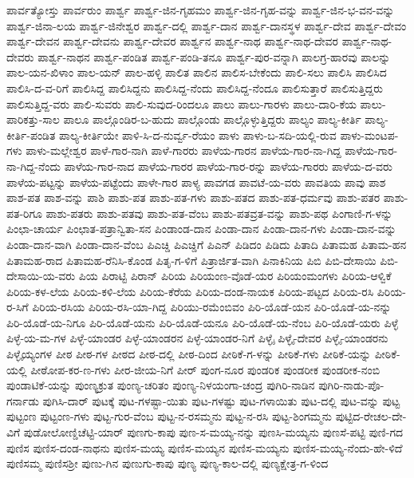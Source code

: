 ಪಾರ್ವತ್ಯೋಸ್ತು
ಪಾರ್ವರುಂ
ಪಾರ್ಶ್ವ
ಪಾರ್ಶ್ವ-ಜಿನ-ಗೃಹಮಂ
ಪಾರ್ಶ್ವ-ಜಿನ-ಗೃಹ-ವನ್ನು
ಪಾರ್ಶ್ವ-ಜಿನ-ಭ-ವನ-ವನ್ನು
ಪಾರ್ಶ್ವ-ಜಿನಾ-ಲಯ
ಪಾರ್ಶ್ವ-ಜಿನೇಶ್ವರ
ಪಾರ್ಶ್ವ-ದಲ್ಲಿ
ಪಾರ್ಶ್ವ-ದಾನ
ಪಾರ್ಶ್ವ-ದಾನಸ್ಥಳ
ಪಾರ್ಶ್ವ-ದೇವ
ಪಾರ್ಶ್ವ-ದೇವಂ
ಪಾರ್ಶ್ವ-ದೇವನ
ಪಾರ್ಶ್ವ-ದೇವನು
ಪಾರ್ಶ್ವ-ದೇವರ
ಪಾರ್ಶ್ವನ
ಪಾರ್ಶ್ವ-ನಾಥ
ಪಾರ್ಶ್ವ-ನಾಥ-ದೇವರ
ಪಾರ್ಶ್ವ-ನಾಥ-ದೇವರು
ಪಾರ್ಶ್ವ-ನಾಥನ
ಪಾರ್ಶ್ವ-ಪಂಡಿತ
ಪಾರ್ಶ್ವ-ಪಂಡಿ-ತನೂ
ಪಾರ್ಶ್ವ-ಪುರ-ವನ್ನಾಗಿ
ಪಾಲಗ್ರ-ಹಾರವು
ಪಾಲನ್ನು
ಪಾಲ-ಯನ-ಖಿಳಾಂ
ಪಾಲ-ಯನ್
ಪಾಲ-ಹಳ್ಳಿ
ಪಾಲಿತ
ಪಾಲಿನ
ಪಾಲಿಸ-ಬೇಕೆಂದು
ಪಾಲಿ-ಸಲು
ಪಾಲಿಸಿ
ಪಾಲಿಸಿದ
ಪಾಲಿಸಿ-ದ-ವ-ರಿಗೆ
ಪಾಲಿಸಿದ್ದ
ಪಾಲಿಸಿದ್ದನು
ಪಾಲಿಸಿದ್ದ-ನೆಂದು
ಪಾಲಿಸಿದ್ದ-ನೆಂದೂ
ಪಾಲಿಸುತ್ತಾರೆ
ಪಾಲಿಸುತ್ತಿದ್ದರು
ಪಾಲಿಸುತ್ತಿದ್ದ-ವರು
ಪಾಲಿ-ಸುವರು
ಪಾಲಿ-ಸುವುದ-ರಿಂದಲೂ
ಪಾಲು
ಪಾಲು-ಗಾರಳು
ಪಾಲು-ದಾರಿ-ಕೆಯ
ಪಾಲು-ಪಾರಿಕತ್ತು-ಸಾಲ
ಪಾಲೂ
ಪಾಲ್ಗೊಂಡಿರ-ಬ-ಹುದು
ಪಾಲ್ಗೊಂಡು
ಪಾಲ್ಗೊಳ್ಳುತ್ತಿದ್ದರು
ಪಾಲ್ಯಂ
ಪಾಲ್ಯ-ಕೀರ್ತಿ
ಪಾಲ್ಯ-ಕೀರ್ತಿ-ಪಂಡಿತ
ಪಾಲ್ಯ-ಕೀರ್ತಿಯೇ
ಪಾಳಿ-ಸಿ-ದ-ನುರ್ವ್ವ-ರೆಯಂ
ಪಾಳು
ಪಾಳು-ಬ-ಸದಿ-ಯಲ್ಲಿ-ರುವ
ಪಾಳು-ಮಂಟಪ-ಗಳು
ಪಾಳು-ಮಲ್ಲೇಶ್ವರ
ಪಾಳೆ-ಗಾರ-ನಾಗಿ
ಪಾಳೆ-ಗಾರರು
ಪಾಳೆಯ-ಗಾರನ
ಪಾಳೆಯ-ಗಾರ-ನಾ-ಗಿದ್ದ
ಪಾಳೆಯ-ಗಾರ-ನಾ-ಗಿದ್ದ-ನೆಂದು
ಪಾಳೆಯ-ಗಾರ-ನಾದ
ಪಾಳೆಯ-ಗಾರರ
ಪಾಳೆಯ-ಗಾರ-ರನ್ನು
ಪಾಳೆಯ-ಗಾರರು
ಪಾಳೆಯ-ದ-ವರು
ಪಾಳೆಯ-ಪಟ್ಟನ್ನು
ಪಾಳೆಯ-ಪಟ್ಟೆಂದು
ಪಾಳೇ-ಗಾರ
ಪಾಳ್ಯ
ಪಾವಗಡ
ಪಾವಟೆ-ಯ-ವರು
ಪಾವತಿಯ
ಪಾವು
ಪಾಶ
ಪಾಶ-ಪತ
ಪಾಶ-ವನ್ನು
ಪಾಶಿ
ಪಾಶು-ಪತ
ಪಾಶು-ಪತ-ಗಳು
ಪಾಶು-ಪತದ
ಪಾಶು-ಪತ-ಧರ್ಮವು
ಪಾಶು-ಪತರ
ಪಾಶು-ಪತ-ರಿಗೂ
ಪಾಶು-ಪತರು
ಪಾಶು-ಪತವು
ಪಾಶು-ಪತ-ವೆಂಬ
ಪಾಶು-ಪತವ್ರತ-ವನ್ನು
ಪಾಶು-ಪಥ
ಪಿಂಗಾಣಿ-ಗ-ಳನ್ನು
ಪಿಂಛಾ-ಚಾರ್ಯ
ಪಿಂಛಾತ-ಪತ್ರಾನ್ವಿತಾ-ಸನ
ಪಿಂಡಾಂಡ-ದಾನ
ಪಿಂಡಾ-ದಾನ
ಪಿಂಡಾ-ದಾನ-ಗಳು
ಪಿಂಡಾ-ದಾನ-ವನ್ನು
ಪಿಂಡಾ-ದಾನ-ವಾಗಿ
ಪಿಂಡಾ-ದಾನ-ವೆಂಬ
ಪಿಎಚ್ಡಿ
ಪಿಎಚ್ಡಿಗೆ
ಪಿಎನ್
ಪಿಡಿದಂ
ಪಿಡಿದು
ಪಿತಾದಿ
ಪಿತಾಮಹ
ಪಿತಾಮ-ಹನ
ಪಿತಾಮಹ-ರಾದ
ಪಿತಾಮಹ-ರೆನಿಸಿ-ಕೊಂಡ
ಪಿತೃ-ಗ-ಳಿಗೆ
ಪಿತ್ರಾರ್ಜಿತ-ವಾಗಿ
ಪಿನಾಕಿನಿಯ
ಪಿಬಿ
ಪಿಬಿ-ದೇಸಾಯಿ
ಪಿಬಿ-ದೇಸಾಯಿ-ಯ-ವರು
ಪಿಯ
ಪಿರಾಟ್ಟಿ
ಪಿರಾನ್
ಪಿರಿಯ
ಪಿರಿಯಂಣ-ವೊಡೆ-ಯರ
ಪಿರಿಯಂಮಂಗಳು
ಪಿರಿಯ-ಆಳ್ವಿಕೆ
ಪಿರಿಯ-ಕಳ-ಲೆಯ
ಪಿರಿಯ-ಕಳಿ-ಲೆಯ
ಪಿರಿಯ-ಕೆರೆಯ
ಪಿರಿಯ-ದಂಡ-ನಾಯಕ
ಪಿರಿಯ-ಪಟ್ಟದ
ಪಿರಿಯ-ರಸಿ
ಪಿರಿಯ-ರ-ಸಿಗೆ
ಪಿರಿಯ-ರಸಿಯ
ಪಿರಿಯ-ರಸಿ-ಯಾ-ಗಿದ್ದ
ಪಿರಿಯು-ರಮೆಂಬಿವಂ
ಪಿರಿ-ಯೊಡೆ-ಯನ
ಪಿರಿ-ಯೊಡೆ-ಯ-ನನ್ನು
ಪಿರಿ-ಯೊಡೆ-ಯ-ನಿಗೂ
ಪಿರಿ-ಯೊಡೆ-ಯನು
ಪಿರಿ-ಯೊಡೆ-ಯನೂ
ಪಿರಿ-ಯೊಡೆ-ಯ-ನೆಂಬ
ಪಿರಿ-ಯೊಡೆ-ಯರು
ಪಿಳ್ಳೆ
ಪಿಳ್ಳೆ-ಯ-ಮ-ಗಳ
ಪಿಳ್ಳೆ-ಯಾಂಡರ
ಪಿಳ್ಳೆ-ಯಾಂಡರನ
ಪಿಳ್ಳೆ-ಯಾಂಡರ-ನಿಗೆ
ಪಿಳ್ಳೈ
ಪಿಳ್ಳೈ-ದೇವರ
ಪಿಳ್ಳೈ-ಯಾಂಡರನು
ಪಿಳ್ಳೈಯ್ಯಂಗಳ
ಪೀಠ
ಪೀಠ-ಗಳ
ಪೀಠದ
ಪೀಠ-ದಲ್ಲಿ
ಪೀಠ-ದಿಂದ
ಪೀಠಿಕೆ-ಗ-ಳನ್ನು
ಪೀಠಿಕೆ-ಗಳು
ಪೀಠಿಕೆ-ಯನ್ನು
ಪೀಠಿಕೆ-ಯಲ್ಲಿ
ಪೀಠೋಪ-ಕರ-ಣ-ಗಳು
ಪೀರ-ಜೀಯ-ನಿಗೆ
ಪೀರ್
ಪುಂಗ-ನೂರ
ಪುಂಡರಿಕ
ಪುಂಡರೀಕ
ಪುಂಡರೀಕ-ನಂಬಿ
ಪುಂಡಾಟಿಕೆ-ಯನ್ನು
ಪುಂಣ್ಯಕ್ರುತ
ಪುಂಣ್ಯ-ಚರಿತಂ
ಪುಂಣ್ಯ-ನಿಳಯಂಗಾ-ಚಂದ್ರ
ಪುಗಿರಿ-ನಾಡಿನ
ಪುಗಿರಿ-ನಾಡು-ಪೊ-ಗರ್ನಾಡು
ಪುಗಿಸಿ-ದಾರ್
ಪುಟಕ್ಕೆ
ಪುಟ-ಗಳಷ್ಟಾ-ಯಿತು
ಪುಟ-ಗಳಷ್ಟು
ಪುಟ-ಗಳಾಯಿತು
ಪುಟ-ದಲ್ಲಿ
ಪುಟ-ವನ್ನು
ಪುಟ್ಟ
ಪುಟ್ಟಂಣ
ಪುಟ್ಟಂಣ-ಗಳು
ಪುಟ್ಟ-ಗುರ-ವೆಂಬ
ಪುಟ್ಟ-ನ-ರಸಮ್ಮನು
ಪುಟ್ಟ-ನ-ರಸಿ
ಪುಟ್ಟ-ಶಿಂಗಮ್ಮನು
ಪುಟ್ಟಿದ-ರೇಚಲ-ದೇ-ವಿಗೆ
ಪುಡೋಲೋಣ್ಡಿಚೆಟ್ಟಿ-ಯಾರ್
ಪುಣಗು-ಕಾಪು
ಪುಣ-ಸ-ಮಯ್ಯ-ನನ್ನು
ಪುಣಸಿ-ಮಯ್ಯನು
ಪುಣಸೆ-ಪಟ್ಟಿ
ಪುಣಿ-ಗದ
ಪುಣಿಸ
ಪುಣಿಸ-ದಂಡ-ನಾಥನು
ಪುಣಿಸ-ಮಯ್ಯ
ಪುಣಿಸ-ಮಯ್ಯನ
ಪುಣಿಸ-ಮಯ್ಯನು
ಪುಣಿಸ-ಮಯ್ಯ-ನೆಂದು-ಹೇ-ಳಿದೆ
ಪುಣಿಸಮ್ಮ
ಪುಣಿಸಶ್ರೀ
ಪುಣು-ಗಿನ
ಪುಣುಗು-ಕಾಪು
ಪುಣ್ಯ
ಪುಣ್ಯ-ಕಾಲ-ದಲ್ಲಿ
ಪುಣ್ಯಕ್ಷೇತ್ರ-ಗ-ಳಿಂದ
